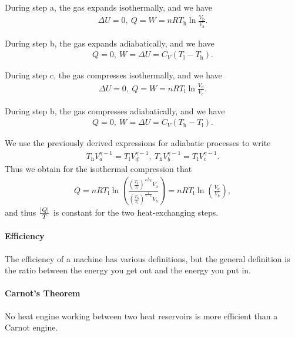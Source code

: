 During step a, the gas expands isothermally, and we have
\begin{align*}
	\Delta U = 0,\ Q = W = nRT_{\text{h}}\ln{\frac{V_{\text{b}}}{V_{\text{a}}}}.
\end{align*}

During step b, the gas expands adiabatically, and we have
\begin{align*}
	Q = 0,\ W = \Delta U = C_{V}(T_{\text{l}} - T_{\text{h}}).
\end{align*}

During step c, the gas compresses isothermally, and we have
\begin{align*}
	\Delta U = 0,\ Q = W = nRT_{\text{l}}\ln{\frac{V_{\text{d}}}{V_{\text{c}}}}.
\end{align*}

During step b, the gas compresses adiabatically, and we have
\begin{align*}
	Q = 0,\ W = \Delta U = C_{V}(T_{\text{h}} - T_{\text{l}}).
\end{align*}

We use the previously derived expressions for adiabatic processes to write
\begin{align*}
	T_{\text{h}}V_{a}^{\gamma - 1} = T_{\text{l}}V_{d}^{\gamma - 1},\ T_{\text{h}}V_{b}^{\gamma - 1} = T_{\text{l}}V_{c}^{\gamma - 1}.
\end{align*}
Thus we obtain for the isothermal compression that
\begin{align*}
	Q = nRT_{\text{l}}\ln(\frac{\left(\frac{T_{\text{h}}}{T_{\text{l}}}\right)^{\frac{1}{\gamma - 1}}V_{a}}{\left(\frac{T_{\text{h}}}{T_{\text{l}}}\right)^{\frac{1}{\gamma - 1}}V_{b}}) = nRT_{\text{l}}\ln(\frac{V_{a}}{V_{b}}),
\end{align*}
and thus $\frac{\abs{Q}}{T}$ is constant for the two heat-exchanging steps.

\paragraph{Efficiency}
The efficiency of a machine has various definitions, but the general definition is the ratio between the energy you get out and the energy you put in.

\paragraph{Carnot's Theorem}
No heat engine working between two heat reservoirs is more efficient than a Carnot engine.


